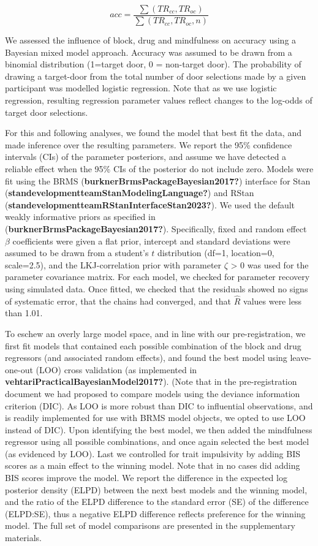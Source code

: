 \documentclass{article}
\begin{document}
\[
acc = \frac{\sum{(TR_{cc}, TR_{oc})}}{\sum{(TR_{cc}, TR_{oc}, n)}}
\]

We assessed the influence of block, drug and mindfulness on accuracy
using a Bayesian mixed model approach. Accuracy was assumed to be drawn
from a binomial distribution (1=target door, 0 = non-target door). The
probability of drawing a target-door from the total number of door
selections made by a given participant was modelled logistic regression.
Note that as we use logistic regression, resulting regression parameter
values reflect changes to the log-odds of target door selections.

For this and following analyses, we found the model that best fit the
data, and made inference over the resulting parameters. We report the
95\% confidence intervals (CIs) of the parameter posteriors, and assume
we have detected a reliable effect when the 95\% CIs of the posterior do
not include zero. Models were fit using the BRMS
(\textbf{burknerBrmsPackageBayesian2017?}) interface for Stan
(\textbf{standevelopmentteamStanModelingLanguage?}) and RStan
(\textbf{standevelopmentteamRStanInterfaceStan2023?}). We used the
default weakly informative priors as specified in
(\textbf{burknerBrmsPackageBayesian2017?}). Specifically, fixed and
random effect \(\beta\) coefficients were given a flat prior, intercept
and standard deviations were assumed to be drawn from a student's \(t\)
distribution (df=1, location=0, scale=2.5), and the LKJ-correlation
prior with parameter \(\zeta\) \textgreater{} 0 was used for the
parameter covariance matrix. For each model, we checked for parameter
recovery using simulated data. Once fitted, we checked that the
residuals showed no signs of systematic error, that the chains had
converged, and that \(\hat{R}\) values were less than 1.01.

To eschew an overly large model space, and in line with our
pre-registration, we first fit models that contained each possible
combination of the block and drug regressors (and associated random
effects), and found the best model using leave-one-out (LOO) cross
validation (as implemented in
\textbf{vehtariPracticalBayesianModel2017?}). (Note that in the
pre-registration document we had proposed to compare models using the
deviance information criterion (DIC). As LOO is more robust than DIC to
influential observations, and is readily implemented for use with BRMS
model objects, we opted to use LOO instead of DIC). Upon identifying the
best model, we then added the mindfulness regressor using all possible
combinations, and once again selected the best model (as evidenced by
LOO). Last we controlled for trait impulsivity by adding BIS scores as a
main effect to the winning model. Note that in no cases did adding BIS
scores improve the model. We report the difference in the expected log
posterior density (ELPD) between the next best models and the winning
model, and the ratio of the ELPD difference to the standard error (SE)
of the difference (ELPD:SE), thus a negative ELPD difference reflects
preference for the winning model. The full set of model comparisons are
presented in the supplementary materials.
\end{document}
